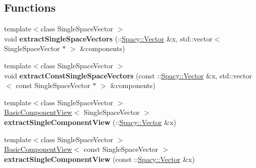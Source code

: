 \subsection*{Functions}
\begin{DoxyCompactItemize}
\item 
{\footnotesize template$<$class Single\+Space\+Vector $>$ }\\void {\bfseries extract\+Single\+Space\+Vectors} (\+::\hyperlink{classSpacy_1_1Vector}{Spacy\+::\+Vector} \&x, std\+::vector$<$ Single\+Space\+Vector $\ast$ $>$ \&components)\hypertarget{namespaceSpacy_1_1ProductSpace_acbae440a7b0142c22b3abb4fceec6a3d}{}\label{namespaceSpacy_1_1ProductSpace_acbae440a7b0142c22b3abb4fceec6a3d}

\item 
{\footnotesize template$<$class Single\+Space\+Vector $>$ }\\void {\bfseries extract\+Const\+Single\+Space\+Vectors} (const \+::\hyperlink{classSpacy_1_1Vector}{Spacy\+::\+Vector} \&x, std\+::vector$<$ const Single\+Space\+Vector $\ast$ $>$ \&components)\hypertarget{namespaceSpacy_1_1ProductSpace_a21a0ee5576b97303796ff46d59b2e138}{}\label{namespaceSpacy_1_1ProductSpace_a21a0ee5576b97303796ff46d59b2e138}

\item 
{\footnotesize template$<$class Single\+Space\+Vector $>$ }\\\hyperlink{structSpacy_1_1ProductSpace_1_1BasicComponentView}{Basic\+Component\+View}$<$ Single\+Space\+Vector $>$ {\bfseries extract\+Single\+Component\+View} (\+::\hyperlink{classSpacy_1_1Vector}{Spacy\+::\+Vector} \&x)\hypertarget{namespaceSpacy_1_1ProductSpace_ad68c9cf83d263605393f28af63801f29}{}\label{namespaceSpacy_1_1ProductSpace_ad68c9cf83d263605393f28af63801f29}

\item 
{\footnotesize template$<$class Single\+Space\+Vector $>$ }\\\hyperlink{structSpacy_1_1ProductSpace_1_1BasicComponentView}{Basic\+Component\+View}$<$ const Single\+Space\+Vector $>$ {\bfseries extract\+Single\+Component\+View} (const \+::\hyperlink{classSpacy_1_1Vector}{Spacy\+::\+Vector} \&x)\hypertarget{namespaceSpacy_1_1ProductSpace_af3dc843c29a545e7f7f4e45b5ae5b02b}{}\label{namespaceSpacy_1_1ProductSpace_af3dc843c29a545e7f7f4e45b5ae5b02b}


\end{DoxyCompactItemize}
